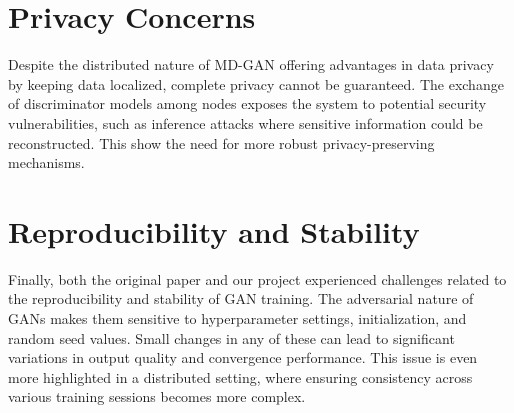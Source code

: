 \section{Privacy Concerns}
Despite the distributed nature of MD-GAN offering advantages in data privacy by keeping data localized, complete privacy cannot be guaranteed. The exchange of discriminator models among nodes exposes the system to potential security vulnerabilities, such as inference attacks where sensitive information could be reconstructed. This show the need for more robust privacy-preserving mechanisms.

\section{Reproducibility and Stability}
Finally, both the original paper and our project experienced challenges related to the reproducibility and stability of GAN training. The adversarial nature of GANs makes them sensitive to hyperparameter settings, initialization, and random seed values. Small changes in any of these can lead to significant variations in output quality and convergence performance. This issue is even more highlighted in a distributed setting, where ensuring consistency across various training sessions becomes more complex.